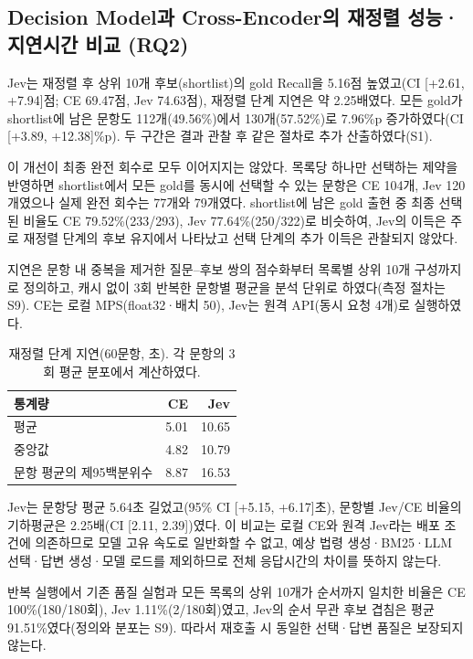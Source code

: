 \subsection{Decision Model과 Cross-Encoder의 재정렬 성능·지연시간 비교 (RQ2)}

\label{sec:ch4_3}

Jev는 재정렬 후 상위 10개 후보(shortlist)의 gold Recall을 5.16점 높였고(CI [+2.61, +7.94]점; CE 69.47점, Jev 74.63점), 재정렬 단계 지연은 약 2.25배였다. 모든 gold가 shortlist에 남은 문항도 112개(49.56\%)에서 130개(57.52\%)로 7.96\%p 증가하였다(CI [+3.89, +12.38]\%p). 두 구간은 결과 관찰 후 같은 절차로 추가 산출하였다(S1).

이 개선이 최종 완전 회수로 모두 이어지지는 않았다. 목록당 하나만 선택하는 제약을 반영하면 shortlist에서 모든 gold를 동시에 선택할 수 있는 문항은 CE 104개, Jev 120개였으나 실제 완전 회수는 77개와 79개였다. shortlist에 남은 gold 출현 중 최종 선택된 비율도 CE 79.52\%(233/293), Jev 77.64\%(250/322)로 비슷하여, Jev의 이득은 주로 재정렬 단계의 후보 유지에서 나타났고 선택 단계의 추가 이득은 관찰되지 않았다.

지연은 문항 내 중복을 제거한 질문–후보 쌍의 점수화부터 목록별 상위 10개 구성까지로 정의하고, 캐시 없이 3회 반복한 문항별 평균을 분석 단위로 하였다(측정 절차는 S9). CE는 로컬 MPS(float32·배치 50), Jev는 원격 API(동시 요청 4개)로 실행하였다.

\begin{table}[H]
\centering
\caption{재정렬 단계 지연(60문항, 초). 각 문항의 3회 평균 분포에서 계산하였다.}
\label{tab:ch4_3}
\small
\setlength{\tabcolsep}{3pt}
\begin{tabular}{@{}lrr@{}}
\hline
통계량 & CE & Jev \\
\hline
평균 & 5.01 & 10.65 \\
중앙값 & 4.82 & 10.79 \\
문항 평균의 제95백분위수 & 8.87 & 16.53 \\
\hline
\end{tabular}
\end{table}

Jev는 문항당 평균 5.64초 길었고(95\% CI [+5.15, +6.17]초), 문항별 Jev/CE 비율의 기하평균은 2.25배(CI [2.11, 2.39])였다. 이 비교는 로컬 CE와 원격 Jev라는 배포 조건에 의존하므로 모델 고유 속도로 일반화할 수 없고, 예상 법령 생성·BM25·LLM 선택·답변 생성·모델 로드를 제외하므로 전체 응답시간의 차이를 뜻하지 않는다.

반복 실행에서 기존 품질 실험과 모든 목록의 상위 10개가 순서까지 일치한 비율은 CE 100\%(180/180회), Jev 1.11\%(2/180회)였고, Jev의 순서 무관 후보 겹침은 평균 91.51\%였다(정의와 분포는 S9). 따라서 재호출 시 동일한 선택·답변 품질은 보장되지 않는다.
